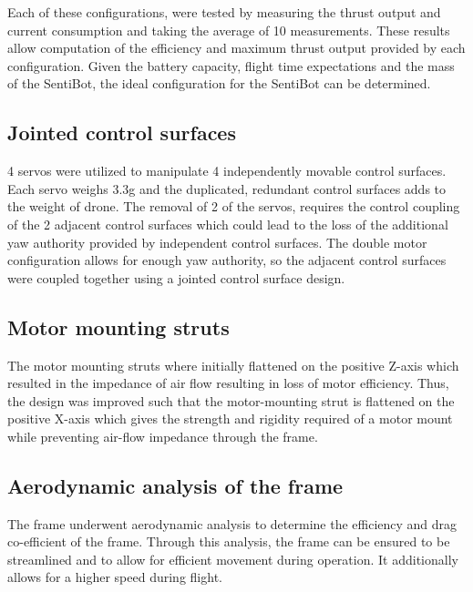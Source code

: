 \documentclass[12pt]{article}
\begin{document}
Each of these configurations, were tested by measuring the thrust output and current consumption and taking the average of 10 measurements. These results allow computation of the efficiency and maximum thrust output provided by each configuration. Given the battery capacity, flight time expectations and the mass of the SentiBot, the ideal configuration for the SentiBot can be determined.

\subsection{Jointed control surfaces}

4 servos were utilized to manipulate 4 independently movable control surfaces. Each servo weighs 3.3g and the duplicated, redundant control surfaces adds to the weight of drone. The removal of 2 of the servos, requires the control coupling of the 2 adjacent control surfaces which could lead to the loss of the additional yaw authority provided by independent control surfaces. The double motor configuration allows for enough yaw authority, so the adjacent control surfaces were coupled together using a jointed control surface design.

\subsection{Motor mounting struts}

The motor mounting struts where initially flattened on the positive Z-axis which resulted in the impedance of air flow resulting in loss of motor efficiency. Thus, the design was improved such that the motor-mounting strut is flattened on the positive X-axis which gives the strength and rigidity required of a motor mount while preventing air-flow impedance through the frame.

\subsection{Aerodynamic analysis of the frame}

The frame underwent aerodynamic analysis to determine the efficiency and drag co-efficient of the frame. Through this analysis, the frame can be ensured to be streamlined and to allow for efficient movement during operation. It additionally allows for a higher speed during flight.
\end{document}
